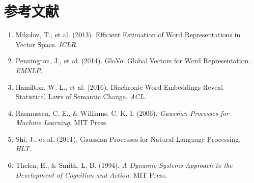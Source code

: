 \documentclass[12pt, a4paper]{article}
\begin{document}
\section*{参考文献}

\begin{enumerate}
    \item Mikolov, T., et al. (2013). Efficient Estimation of Word Representations in Vector Space. \textit{ICLR}.
    \item Pennington, J., et al. (2014). GloVe: Global Vectors for Word Representation. \textit{EMNLP}.
    \item Hamilton, W. L., et al. (2016). Diachronic Word Embeddings Reveal Statistical Laws of Semantic Change. \textit{ACL}.
    \item Rasmussen, C. E., \& Williams, C. K. I. (2006). \textit{Gaussian Processes for Machine Learning}. MIT Press.
    \item Shi, J., et al. (2011). Gaussian Processes for Natural Language Processing. \textit{HLT}.
    \item Thelen, E., \& Smith, L. B. (1994). \textit{A Dynamic Systems Approach to the Development of Cognition and Action}. MIT Press.
\end{enumerate}
\end{document}
